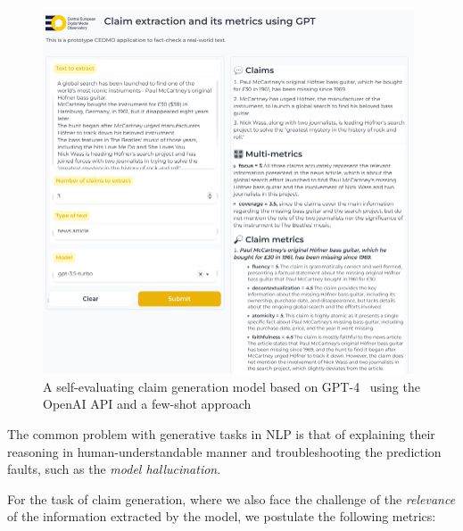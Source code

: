 \begin{figure}
    \includegraphics[width=11cm]{fig/gptext.pdf}
    \caption{A self-evaluating claim generation model based on GPT-4~\cite{gpt4} using the \textsf{OpenAI API} and a few-shot approach}
    \label{fig:gptext}
\end{figure}
\label{sec:metrics}
The common problem with generative tasks in NLP is that of explaining their reasoning in human-understandable manner and troubleshooting the prediction faults, such as the \textit{model hallucination}.

For the task of claim generation, where we also face the challenge of the \textit{relevance} of the information extracted by the model, we postulate the following metrics:


